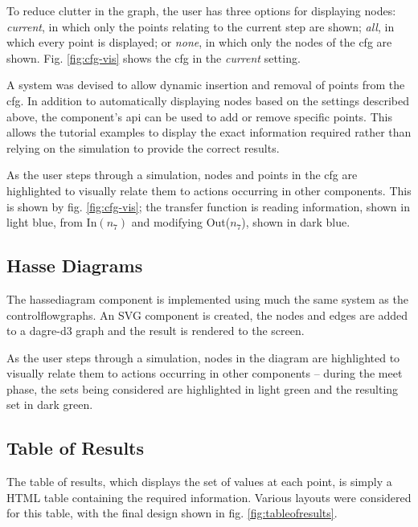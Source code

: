 \documentclass[bsc,twoside,singlespacing,parskip,logo,notimes,normalheadings]{infthesis}
\begin{document}
\begin{figure}[!h]
\begin{minipage}{.38\textwidth}
            \captionsetup{width=6cm, justification=centering}
            \label{fig:lattice}
          \end{minipage}
        \end{figure}

        To reduce clutter in the graph, the user has three options for
        displaying nodes: {\em current}, in which only the points
        relating to the current step are shown; {\em all}, in which
        every point is displayed; or {\em none}, in which only the
        nodes of the \gls{cfg} are shown. Fig. \ref{fig:cfg-vis} shows
        the \gls{cfg} in the {\em current} setting.

        A system was devised to allow dynamic insertion and removal of
        points from the \gls{cfg}. In addition to automatically
        displaying nodes based on the settings described above, the
        component's \gls{api} can be used to add or remove specific
        points. This allows the tutorial examples to display the exact
        information required rather than relying on the simulation to
        provide the correct results.

        As the user steps through a simulation, nodes and points in
        the \gls{cfg} are highlighted to visually relate them to
        actions occurring in other components. This is shown by
        fig. \ref{fig:cfg-vis}; the transfer function is reading
        information, shown in light blue, from In$(n_7)$ and modifying
        Out($n_7$), shown in dark blue.

        \subsection{Hasse Diagrams}

        The \gls{hassediagram} component is implemented using much the
        same system as the \gls{controlflowgraph}s. An SVG component
        is created, the nodes and edges are added to a dagre-d3 graph
        and the result is rendered to the screen.

        As the user steps through a simulation, nodes in the diagram
        are highlighted to visually relate them to actions occurring
        in other components -- during the meet phase, the sets being
        considered are highlighted in light green and the resulting
        set in dark green.

        \subsection{Table of Results}
        The table of results, which displays the set of values at each
        point, is simply a HTML table containing the required
        information. Various layouts were considered for this table,
        with the final design shown in fig. \ref{fig:tableofresults}.
\end{document}
